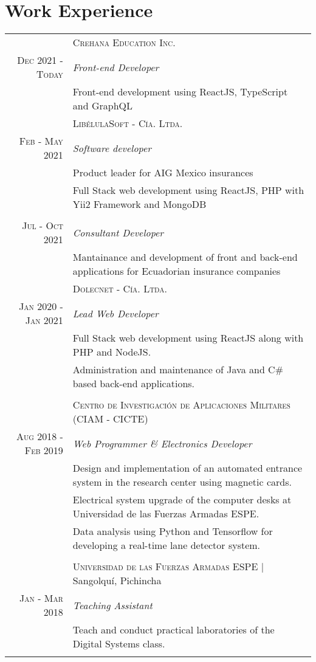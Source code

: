 \documentclass[a4paper,10.9pt]{article}
\begin{document}
\section{Work Experience}
\begin{tabular}{r|p{11cm}}
&\textsc{Crehana Education Inc.} \\
\textsc{Dec 2021 - Today}&\emph{Front-end Developer}\\
&\footnotesize{Front-end development using ReactJS, TypeScript and GraphQL}
\multicolumn{2}{c}{} \\ 
 &\textsc{LibélulaSoft - Cía. Ltda.} \\
\textsc{Feb - May 2021}&\emph{Software developer}\\
&\footnotesize{Product leader for AIG Mexico insurances}
\\
&\footnotesize{Full Stack web development using ReactJS, PHP with Yii2 Framework and MongoDB}\\
\\
\textsc{Jul - Oct 2021}&\emph{Consultant Developer}\\
&\footnotesize{Mantainance and development of front and back-end applications for Ecuadorian insurance companies}
\multicolumn{2}{c}{} \\ 
 &\textsc{Dolecnet - Cía. Ltda.} \\
\textsc{Jan 2020 - Jan 2021} &\emph{Lead Web Developer}\\&\footnotesize{Full Stack web development using ReactJS along with PHP and NodeJS.}
\\&\footnotesize{Administration and maintenance of Java and C\# based back-end applications.}\\
\multicolumn{2}{c}{} \\ 
&\textsc{Centro de Investigación de Aplicaciones Militares (CIAM - CICTE)} \\
\textsc{Aug 2018 - Feb 2019}&\emph{Web Programmer \& Electronics Developer}\\&\footnotesize{Design and implementation of an automated entrance system in the research center using magnetic cards.}\\&\footnotesize{Electrical system upgrade of the computer desks at Universidad de las Fuerzas Armadas ESPE.}\\&\footnotesize{Data analysis using Python and Tensorflow for developing a real-time lane detector system.}\\
\multicolumn{2}{c}{} \\ 
 &\textsc{Universidad de las Fuerzas Armadas ESPE} | Sangolquí, Pichincha \\
 \textsc{Jan - Mar 2018}&\emph{Teaching Assistant}\\&\footnotesize{Teach and conduct practical laboratories of the Digital Systems class.}\\
\\
\end{tabular}
\end{document}
